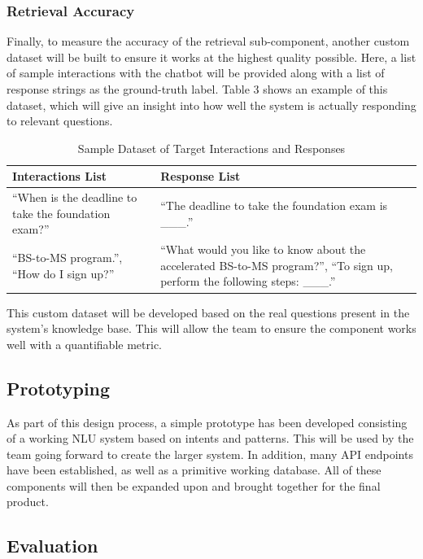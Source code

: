 \documentclass[titlepage, 12pt]{article}
\begin{document}
\subsubsection{Retrieval Accuracy}

Finally, to measure the accuracy of the retrieval sub-component, another custom dataset will be built to ensure it works at the highest quality possible. Here, a list of sample interactions with the chatbot will be provided along with a list of response strings as the ground-truth label. Table 3 shows an example of this dataset, which will give an insight into how well the system is actually responding to relevant questions.

\begin{center}
\begin{table}[h]
\caption{Sample Dataset of Target Interactions and Responses}
    \centering
    \begin{tabular}{ L{6cm} L{6cm} }
        \toprule
        \textbf{Interactions List} & \textbf{Response List}
        \tabularnewline
        \midrule
        “When is the deadline to take the foundation exam?” & “The deadline to take the foundation exam is \_\_\_.”
        \tabularnewline
        \midrule 
        “BS-to-MS program.”, “How do I sign up?” & “What would you like to know about the accelerated BS-to-MS program?”, “To sign up, perform the following steps: \_\_\_.”
        \tabularnewline
        \bottomrule
    \end{tabular}
\end{table}
\end{center}

This custom dataset will be developed based on the real questions present in the system’s knowledge base. This will allow the team to ensure the component works well with a quantifiable metric.

\subsection{Prototyping}

As part of this design process, a simple prototype has been developed consisting of a working NLU system based on intents and patterns. This will be used by the team going forward to create the larger system. In addition, many API endpoints have been established, as well as a primitive working database. All of these components will then be expanded upon and brought together for the final product.

\subsection{Evaluation}
\end{document}
